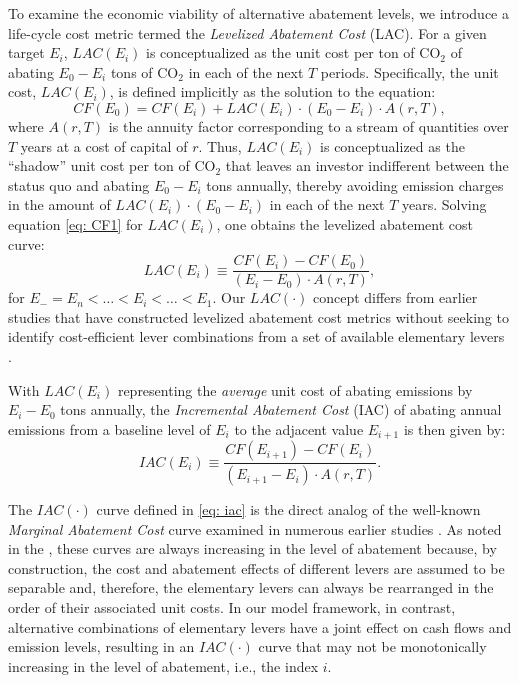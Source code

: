 \documentclass[12pt, a4paper]{article} %
\begin{document}
To examine the economic viability of alternative abatement levels, we introduce a life-cycle cost metric termed the \emph{Levelized Abatement Cost} (LAC). For a given target $E_i$, $LAC(E_i)$  is conceptualized as the unit cost per ton of CO$_2$ of abating $E_0 - E_i$ tons of CO$_2$ in each of the next $T$ periods. Specifically, the unit cost, $LAC(E_i)$, is defined implicitly as the solution to the equation:
\begin{equation}
\label{eq: CF1}
CF(E_0) = CF(E_i) + LAC(E_i) \cdot (E_0 - E_i) \cdot A(r,T),
\end{equation}
where $A(r,T)$ is the annuity factor corresponding to a stream of quantities over $T$ years at a cost of capital of $r$. Thus, $LAC(E_i)$ is conceptualized as the ``shadow'' unit cost per ton of CO$_2$ that leaves an investor indifferent between the status quo and abating $E_0 - E_i$ tons annually, thereby avoiding emission charges in the amount of $LAC(E_i) \cdot (E_0 - E_i)$ in each of the next $T$ years. Solving equation \eqref{eq: CF1} for $LAC(E_i)$, one obtains the levelized abatement cost curve:
\begin{equation}
\label{eq: lac}
LAC(E_i) \equiv \frac{CF(E_i) - CF(E_0)}{(E_i - E_0) \cdot A(r,T)},
\end{equation}
for $E_- = E_n < \ldots < E_i < \ldots < E_1$. Our $LAC(\cdot)$ concept differs from earlier studies that have constructed levelized abatement cost metrics without seeking to identify cost-efficient lever combinations from a set of available elementary levers  \citep{baker2019the,friedmann2020levelized,parkinson2019levelized}.

With $LAC(E_i)$ representing the \emph{average} unit cost of abating emissions by $E_i - E_0$ tons annually, the \emph{Incremental Abatement Cost} (IAC) of abating annual emissions from a baseline level of $E_{i}$ to the adjacent value $E_{i+1}$ is then given by:
\begin{equation}
\label{eq: iac}
IAC(E_i) \equiv \frac{CF(E_{i+1}) - CF(E_{i})}{(E_{i+1} - E_{i}) \cdot A(r,T)}.
\end{equation}

The $IAC(\cdot)$ curve defined in \eqref{eq: iac} is the direct analog of the well-known \emph{Marginal Abatement Cost} curve examined in numerous earlier studies \citep{kuosmanen2021shadow,baker2008technical,beaumont2004abatement}. As noted in the , these curves are always increasing in the level of abatement because, by construction, the cost and abatement effects of different levers are assumed to be separable and, therefore, the elementary levers can always be rearranged in the order of their associated unit costs. In our model framework, in contrast, alternative combinations of elementary levers have a joint effect on cash flows and emission levels, resulting in an $IAC(\cdot)$ curve that may not be monotonically increasing in the level of abatement, i.e., the index $i$.
\end{document}
